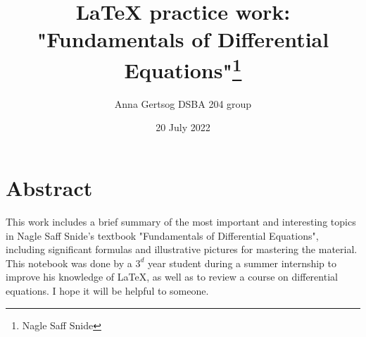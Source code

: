\documentclass{article}
\title{LaTeX practice work: "Fundamentals of Differential Equations"\thanks {Nagle Saff Snide} }
\author{Anna Gertsog DSBA 204 group}
\date{20 July 2022}
\begin{document}
\maketitle
\newpage
\tableofcontents
\newpage
\section{Abstract}
This work includes a brief summary of the most important and interesting topics in Nagle Saff Snide's textbook "Fundamentals of Differential Equations", including significant formulas and illustrative pictures for mastering the material. This notebook was done by a \begin{math}3^d\end{math} year student during a summer internship to improve his knowledge of \LaTeX, as well as to review a course on differential equations. I hope it will be helpful to someone.
\end{document}
